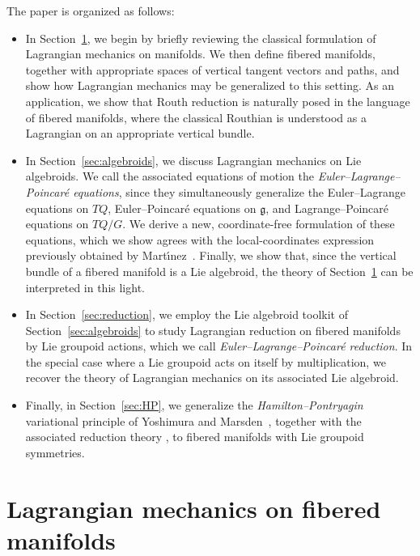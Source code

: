\documentclass[pdftex]{sigma}
\numberwithin{equation}{section}
\begin{document}
The paper is organized as follows:
\begin{itemize}\itemsep=0pt
\item In Section~\ref{sec:EL}, we begin by brief\/ly reviewing the classical formulation of Lagrangian mechanics on manifolds. We then def\/ine f\/ibered manifolds, together with appropriate spaces of vertical tangent vectors and paths, and show how Lagrangian mechanics may be generalized to this setting. As an application, we show that Routh reduction is naturally posed in the language of f\/ibered manifolds, where the classical Routhian is understood as a Lagrangian on an appropriate vertical bundle.

\item In Section~\ref{sec:algebroids}, we discuss Lagrangian mechanics on Lie algebroids. We call the associated equations of motion the \emph{Euler--Lagrange--Poincar\'e equations}, since they simultaneously generalize the Euler--Lagrange equations on $ T Q $, Euler--Poincar\'e equations on $ \mathfrak{g} $, and Lagrange--Poincar\'e equations on $ T Q / G $. We derive a new, coordinate-free formulation of these equations, which we show agrees with the local-coordinates expression previously obtained by Mart\'{\i}nez~\cite{Martinez2001}. Finally, we show that, since the vertical bundle of a f\/ibered manifold is a Lie algebroid, the theory of Section~\ref{sec:EL} can be interpreted in this light.

\item In Section~\ref{sec:reduction}, we employ the Lie algebroid toolkit of Section~\ref{sec:algebroids} to study Lagrangian reduction on f\/ibered
 manifolds by Lie groupoid actions, which we call \emph{Euler--Lagrange--Poincar\'e reduction}. In the special case where a Lie groupoid acts on itself by multiplication, we recover the theory of Lagrangian mechanics on its associated Lie algebroid.

\item Finally, in Section~\ref{sec:HP}, we generalize the \emph{Hamilton--Pontryagin} variational principle of Yoshimura and Marsden~\cite{YoMa2006b}, together with the associated reduction theory \cite{YoMa2007}, to f\/ibered manifolds with Lie groupoid symmetries.
\end{itemize}

\section{Lagrangian mechanics on f\/ibered manifolds}\label{sec:EL}
\end{document}
